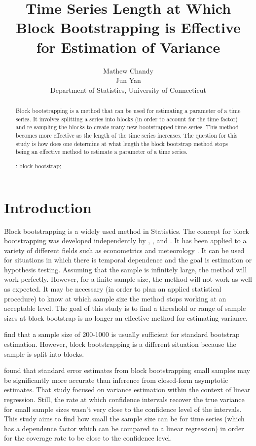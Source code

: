 \documentclass[12pt, letterpaper, titlepage]{article}
\title{Time Series Length at Which Block Bootstrapping is Effective for Estimation of Variance}
\author{Mathew Chandy\\
  Jun Yan\\[1ex]
  Department of Statistics, University of Connecticut\\
}
\date{}
\begin{document}
 
\maketitle

\doublespace

\begin{abstract}
Block bootstrapping is a method that can be used for estimating a parameter of a time
series. It involves splitting a series into blocks (in order to account for the time
factor) and re-sampling the blocks to create many new bootstrapped time series.
This method becomes more effective as the length of the time series increases. 
The question for this study is how does one determine at what length the block
bootstrap method stops being an effective method to estimate a parameter of a time
series.

\bigskip
\noindent{}:
block bootstrap;
\end{abstract}

\section{Introduction}
\label{sec:intro}

Block bootstrapping is a widely used method in Statistics. The concept for block 
bootstrapping was developed independently by \citet{hall1985resampling}, \citet{carlstein1986use}, and 
\citet{kunsch1989jackknife}. \citet{radovanov2014comparison} It has been applied to a variety of 
different fields such 
as econometrics \citep{mackinnon2006bootstrap} and meteorology \citep{varga2017generalised}. It can be used for 
situations in which there is temporal dependence and the goal is estimation or hypothesis 
testing. Assuming that the sample is infinitely 
large, the method will work perfectly. However, for a finite sample size, the method will 
not work as well as expected. It may be necessary (in order to plan an applied 
statistical 
procedure) to know at which sample size the method stops working at an acceptable level. 
The goal of this study is to find a threshold or range of sample sizes at block bootstrap 
is no longer an effective method for estimating variance.


\citet{nevitt2001performance} find that a sample size of 200-1000 is usually sufficient for standard 
bootstrap estimation. However, block bootstrapping is a different situation because the 
sample is split into blocks.

\citet{goncalves2005bootstrap} found that standard error estimates from block bootstrapping small 
samples 
may be significantly more accurate than inference from closed-form asymptotic estimates. That study focused on variance estimation within the context of linear regression. Still, the rate at which confidence intervals recover the true variance for small sample sizes wasn't very close to the confidence level of the intervals. This study aims to find how small the sample size can be for time series (which has a dependence factor which can be compared to a linear regression) in order for the coverage rate to be close to the confidence level.
\end{document}
